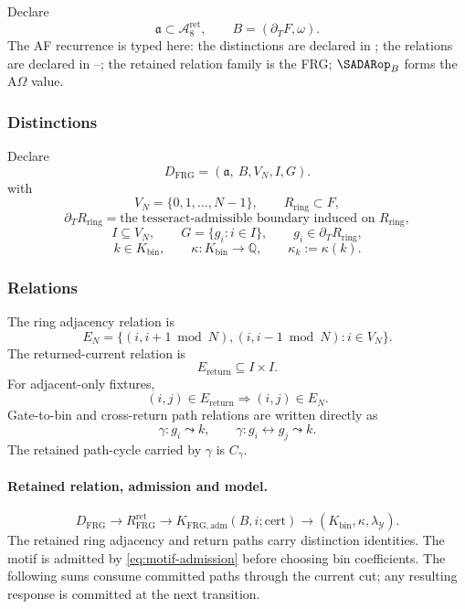 Declare
\begin{equation}
\mathfrak a\subset \mathcal A^{\mathrm{ret}}_8,
\qquad
B=(\partial_TF,\omega).
\label{eq:frg-scope}
\end{equation}
The AF recurrence is typed here: the distinctions are declared in ; the relations are declared in --; the retained relation family is the FRG; \(\SADARop_B\) forms the A\(\Omega\) value.

\subsubsection{Distinctions}
\label{subsec:frg-distinctions}
Declare
\begin{equation}
D_{\mathrm{FRG}}
=
(\mathfrak a,\ B,V_N,I,G).
\label{eq:frg-distinctions}
\end{equation}
with
\[
V_N=\{0,1,\ldots,N-1\},
\qquad
R_{\mathrm{ring}}\subset F,
\]
\[
\partial_T R_{\mathrm{ring}}
=
\text{the tesseract-admissible boundary induced on }R_{\mathrm{ring}},
\]
\[
I\subseteq V_N,
\qquad
G=\{g_i:i\in I\},
\qquad
g_i\in\partial_T R_{\mathrm{ring}},
\]
\[
k\in K_{\mathrm{bin}},
\qquad
\kappa:K_{\mathrm{bin}}\to\mathbb Q,
\qquad
\kappa_k:=\kappa(k).
\]

\subsubsection{Relations}
\label{subsec:frg-relations}
The ring adjacency relation is
\begin{equation}
E_N=
\{(i,i+1\bmod N),(i,i-1\bmod N):i\in V_N\}.
\label{eq:frg-ring-adjacency}
\end{equation}
The returned-current relation is
\begin{equation}
E_{\mathrm{return}}\subseteq I\times I.
\label{eq:frg-return-relation}
\end{equation}
For adjacent-only fixtures,
\begin{equation}
(i,j)\in E_{\mathrm{return}}
\Rightarrow
(i,j)\in E_N.
\label{eq:frg-adjacent-only-condition}
\end{equation}
Gate-to-bin and cross-return path relations are written directly as
\[
\gamma:g_i\leadsto k,
\qquad
\gamma:g_i\leftrightarrow g_j\leadsto k.
\]
The retained path-cycle carried by \(\gamma\) is \(C_\gamma\).

\paragraph{Retained relation, admission and model.}
\begin{equation}
D_{\mathrm{FRG}}\longrightarrow R^{\mathrm{ret}}_{\mathrm{FRG}}
\longrightarrow K_{\mathrm{FRG,adm}}(B,i;\mathrm{cert})
\longrightarrow(K_{\mathrm{bin}},\kappa,\lambda_{\mathcal Y}).
\label{eq:frg-admission-order}
\end{equation}
The retained ring adjacency and return paths carry distinction identities.
The motif is admitted by \eqref{eq:motif-admission} before choosing bin
coefficients. The following sums consume committed paths through the current
cut; any resulting response is committed at the next transition.

